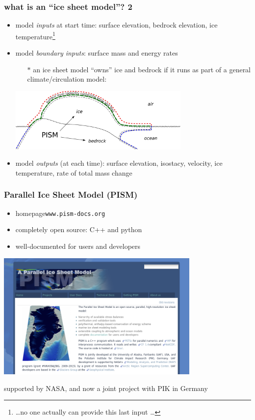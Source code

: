 \documentclass{beamer}
\begin{document}
\begin{frame}
  \frametitle{what is an ``ice sheet model''? 2}
\small

\begin{itemize}
\item model \emph{inputs} at start time: surface elevation, bedrock elevation, ice temperature\footnote{\tiny \dots no one actually can provide this last input \dots}
\item model \emph{boundary inputs}: surface mass and energy rates
  \begin{itemize}
  \item[$\ast$] an ice sheet model ``owns'' ice and bedrock if it runs as part of a general climate/circulation model:
  \end{itemize}
  \begin{center}
  \includegraphics[width=0.7\textwidth]{climate-cartoon}
  \end{center}
\item model \emph{outputs} (at each time): surface elevation, isostacy, velocity, ice temperature,  \alert{rate of total mass change}
\end{itemize}


\end{frame}


\begin{frame}
  \frametitle{Parallel Ice Sheet Model (PISM)}

\begin{itemize}
\item homepage\qquad \texttt{www.pism-docs.org}
\item completely open source: C++ and python
\item well-documented for users and developers
\end{itemize}

\begin{center}
    \includegraphics[width=0.75\textwidth]{pismdocs-page}
\end{center}

\scriptsize
supported by NASA, and now a joint project with PIK in Germany
\end{frame}
\end{document}
